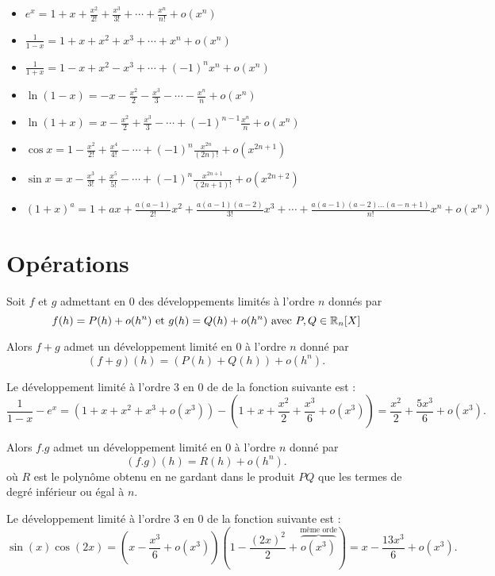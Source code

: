 \documentclass{book}
\begin{document}
\begin{Proposition}
\begin{itemize}
\item $e^{x}=1+x+{\frac {x^{2}}{2!}}+{\frac {x^{3}}{3!}}+\cdots +{\frac {x^{n}}{n!}}+o(x^{n})$
\item $\frac {1}{1-x}=1+x+x^{2}+x^{3}+\cdots +x^{n}+o(x^{n})$
\item $\frac {1}{1+x}=1-x+x^{2}-x^{3}+\cdots +(-1)^{n}x^{n}+o(x^{n})$
\item $\ln {(1-x)}=-x-{\frac {x^{2}}{2}}-{\frac {x^{3}}{3}}-\cdots -{\frac {x^{n}}{n}}+o(x^{n})$
\item $\ln {(1+x)}=x-{\frac {x^{2}}{2}}+{\frac {x^{3}}{3}}-\cdots +(-1)^{n-1}{\frac {x^{n}}{n}}+o(x^{n})$
\item $\cos x=1-{\frac {x^{2}}{2!}}+{\frac {x^{4}}{4!}}-\cdots +(-1)^{n}{\frac {x^{2n}}{(2n)!}}+o(x^{2n+1})$
\item $\sin x=x-{\frac {x^{3}}{3!}}+{\frac {x^{5}}{5!}}-\cdots +(-1)^{n}{\frac {x^{2n+1}}{(2n+1)!}}+o(x^{2n+2})$
\item $(1+x)^{a}=1+ax+{\frac {a(a-1)}{2!}}x^{2}+{\frac {a(a-1)(a-2)}{3!}}x^{3}+\cdots +{\frac {a(a-1)(a-2)...(a-n+1)}{n!}}x^{n}+o(x^{n})$
\end{itemize}
\end{Proposition}
\section{Opérations}
Soit $f$ et $g$ admettant en $0$ des développements limités à l'ordre $n$ donnés par
$$ f(h)=P(h) + o(h^n) \text{ et } g(h)=Q(h) + o(h^n) \text{ avec }P,Q\in \mathbb{R}_n[X]$$
\begin{Proposition}[Somme]
Alors $f+g$ admet un développement limité en $0$ à l'ordre $n$ donné par
$$(f+g)(h)=(P(h)+Q(h))+o(h^n).$$
\end{Proposition}
\begin{Exemple}
Le développement limité à l'ordre $3$ en $0$ de de la fonction suivante est :
$$ \frac{1}{1-x}-e^x = (1+x+x^2+x^3+o(x^3))-(1+x+\frac{x^2}{2}+\frac{x^3}{6}+o(x^3))=\frac{x^2}{2}+\frac{5x^3}{6}+o(x^3).$$
\end{Exemple}
\begin{Proposition}[Produit]
Alors $f.g$ admet un développement limité en $0$ à l'ordre $n$ donné par
$$(f.g)(h)=R(h)+o(h^n).$$
où $R$ est le polynôme obtenu en ne gardant dans le produit $PQ$ que les termes de degré inférieur ou égal à $n$.
\end{Proposition}
\begin{Exemple}
Le développement limité à l'ordre $3$ en $0$ de la fonction suivante est :
$$ \sin (x) \cos (2x) = \left(x-\frac{x^{3}}{6}+o(x^3)\right)\left(1-\frac{(2x)^2}{2}+\overbrace{o(x^3)}^{\text{même orde}}\right)=x-\frac{13x^3}{6}+o(x^3).$$
\end{Exemple}
\end{document}
